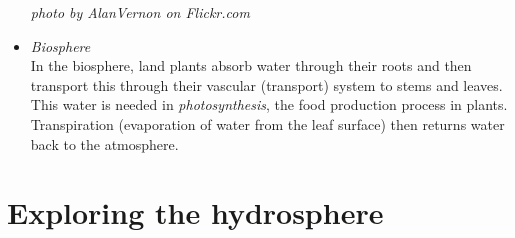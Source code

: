 \begin{itemize}[noitemsep]
\begin{minipage}{.4\textwidth}
\begin{center}
\textsl{photo by AlanVernon on Flickr.com}
 \end{center}
\end{minipage}
\label{m38138*uid3}\item \textsl{Biosphere}\\
In the biosphere, land plants absorb water through their roots and then transport this through their vascular (transport) system to stems and leaves. This water is needed in \textsl{photosynthesis}, the food production process in plants. Transpiration (evaporation of water from the leaf surface) then returns water back to the atmosphere.
\end{itemize}


    \section{Exploring the hydrosphere}
            \nopagebreak

